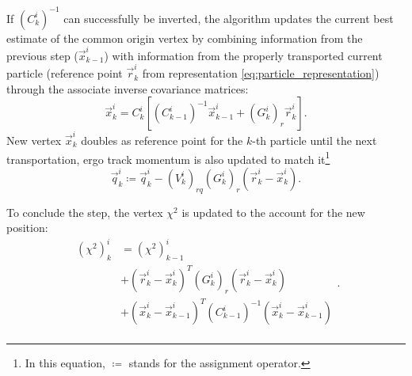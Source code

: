 

If ${(C^i_k)}^{-1}$ can successfully be inverted, the algorithm updates the current best estimate of the common origin vertex by combining information from the previous step ($\vec{x}_{k-1}^i$) with information from the properly transported current particle (reference point $\vec{r}_k^i$ from representation \eqref{eq:particle_representation}) through the associate inverse covariance matrices:
\begin{equation}
\vec{x}_k^i = C_k^i \left[
	{(C^i_{k-1})}^{-1} \vec{x}_{k-1}^i
	+ {(G_k^i)}_r \vec{r}_k^i
\right].
\label{eq:VF_new_vertex_final}
\end{equation}
New vertex $\vec{x}_k^i$ doubles as reference point for the $k$-th particle until the next transportation, ergo track momentum is also updated to match it\footnote{In this equation, $\coloneqq$ stands for the assignment operator.}
\begin{equation}
	\vec{q}_k^i \coloneqq
	\vec{q}_k^i
	-
	{(V_k^i)}_{rq}
	{(G_k^i)}_r
	\left(
		\vec{r}_k^i - \vec{x}_k^i
	\right).
	\label{eq:VF_momentum_final}
\end{equation}

To conclude the step, the vertex $\chi^2$ is updated to the account for the new position:
\begin{equation}
\begin{aligned}
	{(\chi^2)}_k^i &= {(\chi^2)}_{k-1}^i \\
	&+
	{\left(\vec{r}_{k}^i - \vec{x}_k^i\right)}^T  {(G_k^i)}_r \left(\vec{r}_{k}^i - \vec{x}_k^i \right) \\
	&+
	{\left(\vec{x}_k^i - \vec{x}_{k-1}^i\right)}^T  {(C_{k-1}^i)}^{-1} \left(\vec{x}_k^i - \vec{x}_{k-1}^i\right) \\
\end{aligned}.
\label{eq:VF_vertex_chi2_final}
\end{equation}

